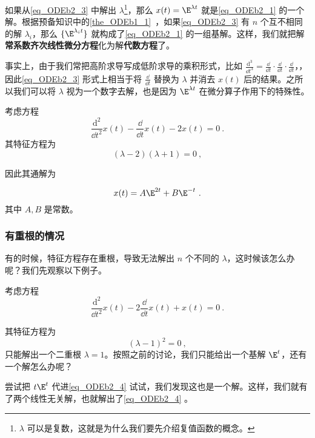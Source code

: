 如果从\autoref{eq_ODEb2_3} 中解出 $\lambda$\footnote{$\lambda$ 可以是复数，这就是为什么我们要先介绍复值函数的概念。}，那么 $x(t)=\E^{\lambda t}$ 就是\autoref{eq_ODEb2_1} 的一个解。根据预备知识中的\autoref{the_ODEb1_1}~，如果\autoref{eq_ODEb2_3} 有 $n$ 个互不相同的解 $\lambda_i$，那么 $\{\E^{\lambda_i t}\}$ 就构成了\autoref{eq_ODEb2_1} 的一组基解。这样，我们就把解\textbf{常系数齐次线性微分方程}化为解\textbf{代数方程}了。


事实上，由于我们常把高阶求导写成低阶求导的乘积形式，比如 $\frac{\mathrm{d}^3}{\dd t^3}=\frac{\dd }{\dd t}\cdot\frac{\dd }{\dd t}\cdot\frac{\dd }{\dd t}$，，因此\autoref{eq_ODEb2_3} 形式上相当于将 $\frac{\dd }{\dd t}$ 替换为 $\lambda$ 并消去 $x(t)$ 后的结果。之所以我们可以将 $\lambda$ 视为一个数字去解，也是因为 $\E^{\lambda t}$ 在微分算子作用下的特殊性。


\begin{example}{}
考虑方程
\begin{equation}
\frac{\mathrm{d}^2}{\dd t^2}x(t)-\frac{\dd }{\dd t}x(t)-2x(t)=0~.
\end{equation}
其特征方程为
\begin{equation}
(\lambda-2)(\lambda+1)=0~,
\end{equation}

因此其通解为

\begin{equation}
x(t)=A\E^{2t}+B\E^{-t}~.
\end{equation}
其中 $A, B$ 是常数。




\end{example}






\subsubsection{有重根的情况}



有的时候，特征方程存在重根，导致无法解出 $n$ 个不同的 $\lambda$，这时候该怎么办呢？我们先观察以下例子。

\begin{example}{}\label{ex_ODEb2_1}
考虑方程
\begin{equation}\label{eq_ODEb2_4}
\frac{\mathrm{d}^2}{\dd t^2}x(t)-2\frac{\dd }{\dd t}x(t)+x(t)=0~.
\end{equation}

其特征方程为
\begin{equation}
(\lambda-1)^2=0~,
\end{equation}
只能解出一个二重根 $\lambda=1$。按照之前的讨论，我们只能给出一个基解 $\E^{t}$，还有一个解怎么办呢？

尝试把 $t\E^{t}$ 代进\autoref{eq_ODEb2_4} 试试，我们发现这也是一个解。这样，我们就有了两个线性无关解，也就解出了\autoref{eq_ODEb2_4} 。




\end{example}




